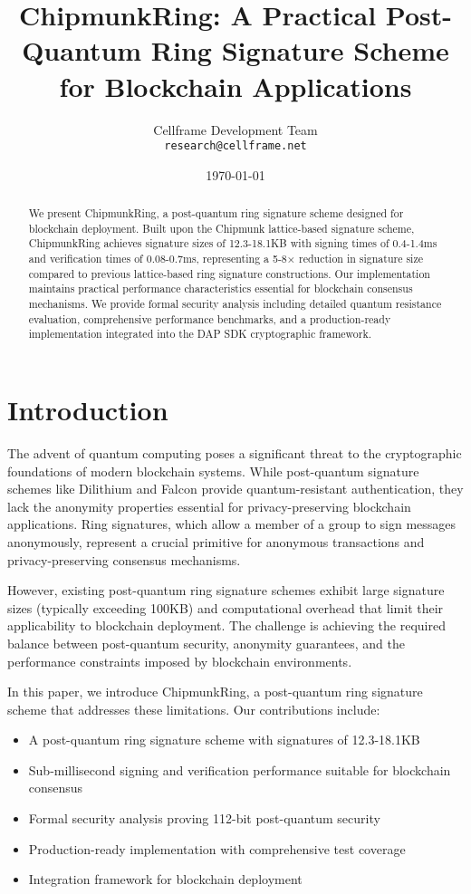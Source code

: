 \documentclass[11pt,a4paper]{article}
\title{ChipmunkRing: A Practical Post-Quantum Ring Signature Scheme for Blockchain Applications}
\author{
Cellframe Development Team\\
\texttt{research@cellframe.net}
}
\date{\today}
\begin{document}
\maketitle

\begin{abstract}
We present ChipmunkRing, a post-quantum ring signature scheme designed for blockchain deployment. Built upon the Chipmunk lattice-based signature scheme, ChipmunkRing achieves signature sizes of 12.3-18.1KB with signing times of 0.4-1.4ms and verification times of 0.08-0.7ms, representing a 5-8× reduction in signature size compared to previous lattice-based ring signature constructions. Our implementation maintains practical performance characteristics essential for blockchain consensus mechanisms. We provide formal security analysis including detailed quantum resistance evaluation, comprehensive performance benchmarks, and a production-ready implementation integrated into the DAP SDK cryptographic framework.
\end{abstract}

\section{Introduction}

The advent of quantum computing poses a significant threat to the cryptographic foundations of modern blockchain systems. While post-quantum signature schemes like Dilithium and Falcon provide quantum-resistant authentication, they lack the anonymity properties essential for privacy-preserving blockchain applications. Ring signatures, which allow a member of a group to sign messages anonymously, represent a crucial primitive for anonymous transactions and privacy-preserving consensus mechanisms.

However, existing post-quantum ring signature schemes exhibit large signature sizes (typically exceeding 100KB) and computational overhead that limit their applicability to blockchain deployment. The challenge is achieving the required balance between post-quantum security, anonymity guarantees, and the performance constraints imposed by blockchain environments.

In this paper, we introduce ChipmunkRing, a post-quantum ring signature scheme that addresses these limitations. Our contributions include:

\begin{itemize}
\item A post-quantum ring signature scheme with signatures of 12.3-18.1KB
\item Sub-millisecond signing and verification performance suitable for blockchain consensus
\item Formal security analysis proving 112-bit post-quantum security
\item Production-ready implementation with comprehensive test coverage
\item Integration framework for blockchain deployment
\end{itemize}
\end{document}
